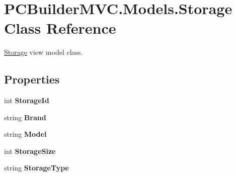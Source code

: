 \hypertarget{class_p_c_builder_m_v_c_1_1_models_1_1_storage}{}\section{P\+C\+Builder\+M\+V\+C.\+Models.\+Storage Class Reference}
\label{class_p_c_builder_m_v_c_1_1_models_1_1_storage}


\hyperlink{class_p_c_builder_m_v_c_1_1_models_1_1_storage}{Storage} view model class.  


\subsection*{Properties}
\begin{DoxyCompactItemize}
\item 
int {\bfseries Storage\+Id}\hypertarget{class_p_c_builder_m_v_c_1_1_models_1_1_storage_a3cc8dc183a416bd6f252aa4cd15db0e0}{}\label{class_p_c_builder_m_v_c_1_1_models_1_1_storage_a3cc8dc183a416bd6f252aa4cd15db0e0}

\item 
string {\bfseries Brand}\hypertarget{class_p_c_builder_m_v_c_1_1_models_1_1_storage_a49ebbbd5fb7b705bc2a4503ac33f3c7d}{}\label{class_p_c_builder_m_v_c_1_1_models_1_1_storage_a49ebbbd5fb7b705bc2a4503ac33f3c7d}

\item 
string {\bfseries Model}\hypertarget{class_p_c_builder_m_v_c_1_1_models_1_1_storage_aec673b76572617deb16dfb6752004928}{}\label{class_p_c_builder_m_v_c_1_1_models_1_1_storage_aec673b76572617deb16dfb6752004928}

\item 
int {\bfseries Storage\+Size}\hypertarget{class_p_c_builder_m_v_c_1_1_models_1_1_storage_a3d1b7129b9e0c68c5e91e8055df26351}{}\label{class_p_c_builder_m_v_c_1_1_models_1_1_storage_a3d1b7129b9e0c68c5e91e8055df26351}

\item 
string {\bfseries Storage\+Type}\hypertarget{class_p_c_builder_m_v_c_1_1_models_1_1_storage_aee536ea2fd0c7014a62787e4b5352f40}{}\label{class_p_c_builder_m_v_c_1_1_models_1_1_storage_aee536ea2fd0c7014a62787e4b5352f40}


\end{DoxyCompactItemize}
